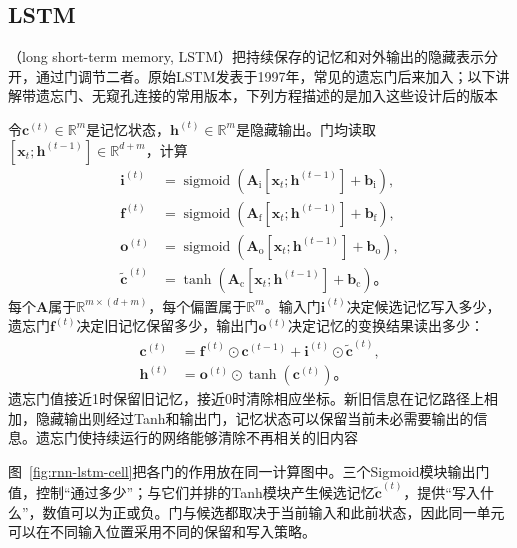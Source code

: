 \subsection{LSTM}
\label{sec:rnn-lstm}

（long short-term memory, LSTM）把持续保存的记忆和对外输出的隐藏表示分开，通过门调节二者。原始LSTM发表于1997年，常见的遗忘门后来加入；以下讲解带遗忘门、无窥孔连接的常用版本，下列方程描述的是加入这些设计后的版本

令$\bm{c}^{(t)}\in\mathbb{R}^{m}$是记忆状态，$\bm{h}^{(t)}\in\mathbb{R}^{m}$是隐藏输出。门均读取$[\bm{x}_t;\bm{h}^{(t-1)}]\in\mathbb{R}^{d+m}$，计算
\begin{equation}
  \begin{aligned}
    \bm{i}^{(t)}&=\operatorname{sigmoid}\!\left(
      \bm{A}_{\mathrm{i}}[\bm{x}_t;\bm{h}^{(t-1)}]+\bm{b}_{\mathrm{i}}\right),\\
    \bm{f}^{(t)}&=\operatorname{sigmoid}\!\left(
      \bm{A}_{\mathrm{f}}[\bm{x}_t;\bm{h}^{(t-1)}]+\bm{b}_{\mathrm{f}}\right),\\
    \bm{o}^{(t)}&=\operatorname{sigmoid}\!\left(
      \bm{A}_{\mathrm{o}}[\bm{x}_t;\bm{h}^{(t-1)}]+\bm{b}_{\mathrm{o}}\right),\\
    \widetilde{\bm{c}}^{(t)}&=\tanh\!\left(
      \bm{A}_{\mathrm{c}}[\bm{x}_t;\bm{h}^{(t-1)}]+\bm{b}_{\mathrm{c}}\right)\text{。}
  \end{aligned}
  \label{eq:rnn-lstm-gates}
\end{equation}
每个$\bm{A}$属于$\mathbb{R}^{m\times(d+m)}$，每个偏置属于$\mathbb{R}^{m}$。输入门$\bm{i}^{(t)}$决定候选记忆写入多少，遗忘门$\bm{f}^{(t)}$决定旧记忆保留多少，输出门$\bm{o}^{(t)}$决定记忆的变换结果读出多少：
\begin{equation}
  \begin{aligned}
    \bm{c}^{(t)}&=\bm{f}^{(t)}\odot\bm{c}^{(t-1)}
       +\bm{i}^{(t)}\odot\widetilde{\bm{c}}^{(t)},\\
    \bm{h}^{(t)}&=\bm{o}^{(t)}\odot\tanh\!\left(\bm{c}^{(t)}\right)\text{。}
  \end{aligned}
  \label{eq:rnn-lstm-update}
\end{equation}
遗忘门值接近1时保留旧记忆，接近0时清除相应坐标。新旧信息在记忆路径上相加，隐藏输出则经过Tanh和输出门，记忆状态可以保留当前未必需要输出的信息。遗忘门使持续运行的网络能够清除不再相关的旧内容

图~\ref{fig:rnn-lstm-cell}把各门的作用放在同一计算图中。三个Sigmoid模块输出门值，控制“通过多少”；与它们并排的Tanh模块产生候选记忆$\widetilde{\bm c}^{(t)}$，提供“写入什么”，数值可以为正或负。门与候选都取决于当前输入和此前状态，因此同一单元可以在不同输入位置采用不同的保留和写入策略。

